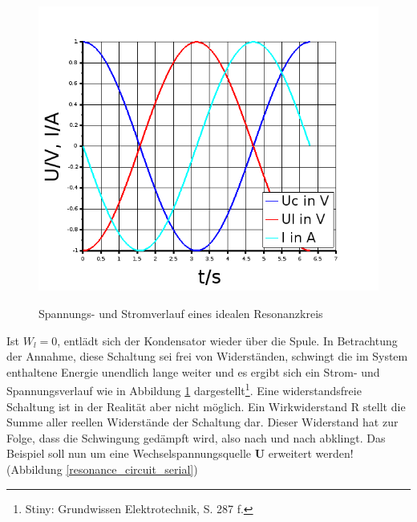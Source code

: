 {{\clearpage

\begin{figure}[H]
  \centering
  \includegraphics[width=\textwidth]{Graphics/ResonanceCircuit_UcUl.png}
  \caption{Spannungs- und Stromverlauf eines idealen Resonanzkreis}{}
  \label{resonance_circuit_simple_diagram}
\end{figure}

\noindent Ist \(W_l = 0\), entlädt sich der Kondensator wieder über die Spule. In Betrachtung der Annahme, diese Schaltung sei frei von Widerständen, schwingt die im System enthaltene Energie unendlich lange weiter und es ergibt sich ein Strom- und Spannungsverlauf wie in Abbildung \ref{resonance_circuit_simple_diagram} dargestellt\footnote{Stiny: Grundwissen Elektrotechnik, S. 287 f.}. Eine widerstandsfreie Schaltung ist in der Realität aber nicht möglich. Ein Wirkwiderstand R stellt die Summe aller reellen Widerstände der Schaltung dar. Dieser Widerstand hat zur Folge, dass die Schwingung gedämpft wird, also nach und nach abklingt. Das Beispiel soll nun um eine Wechselspannungsquelle \textbf{U} erweitert werden! (Abbildung \ref{resonance_circuit_serial})

\clearpage

}}
